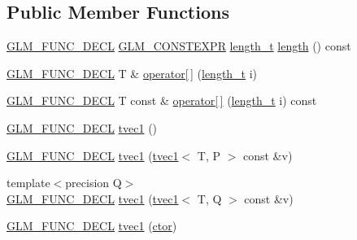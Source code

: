 \subsection*{Public Member Functions}
\begin{DoxyCompactItemize}
\item 
\hyperlink{setup_8hpp_ab2d052de21a70539923e9bcbf6e83a51}{G\+L\+M\+\_\+\+F\+U\+N\+C\+\_\+\+D\+E\+CL} \hyperlink{setup_8hpp_a08b807947b47031d3a511f03f89645ad}{G\+L\+M\+\_\+\+C\+O\+N\+S\+T\+E\+X\+PR} \hyperlink{namespaceglm_a090a0de2260835bee80e71a702492ed9}{length\+\_\+t} \hyperlink{structglm_1_1detail_1_1tvec1_a82fff0257ca2da5997924ce1146e34cb}{length} () const
\item 
\hyperlink{setup_8hpp_ab2d052de21a70539923e9bcbf6e83a51}{G\+L\+M\+\_\+\+F\+U\+N\+C\+\_\+\+D\+E\+CL} T \& \hyperlink{structglm_1_1detail_1_1tvec1_adb575b50f9ef01bf4a6a4ecdfb82ac59}{operator\mbox{[}$\,$\mbox{]}} (\hyperlink{namespaceglm_a090a0de2260835bee80e71a702492ed9}{length\+\_\+t} i)
\item 
\hyperlink{setup_8hpp_ab2d052de21a70539923e9bcbf6e83a51}{G\+L\+M\+\_\+\+F\+U\+N\+C\+\_\+\+D\+E\+CL} T const  \& \hyperlink{structglm_1_1detail_1_1tvec1_a219b839386858d9412d219bafc1b12ba}{operator\mbox{[}$\,$\mbox{]}} (\hyperlink{namespaceglm_a090a0de2260835bee80e71a702492ed9}{length\+\_\+t} i) const
\item 
\hyperlink{setup_8hpp_ab2d052de21a70539923e9bcbf6e83a51}{G\+L\+M\+\_\+\+F\+U\+N\+C\+\_\+\+D\+E\+CL} \hyperlink{structglm_1_1detail_1_1tvec1_aa5c5b819c38630370d7cadd0a578709e}{tvec1} ()
\item 
\hyperlink{setup_8hpp_ab2d052de21a70539923e9bcbf6e83a51}{G\+L\+M\+\_\+\+F\+U\+N\+C\+\_\+\+D\+E\+CL} \hyperlink{structglm_1_1detail_1_1tvec1_a5c5c89fea0163e5ad580d6b66347c726}{tvec1} (\hyperlink{structglm_1_1detail_1_1tvec1}{tvec1}$<$ T, P $>$ const \&v)
\item 
{\footnotesize template$<$precision Q$>$ }\\\hyperlink{setup_8hpp_ab2d052de21a70539923e9bcbf6e83a51}{G\+L\+M\+\_\+\+F\+U\+N\+C\+\_\+\+D\+E\+CL} \hyperlink{structglm_1_1detail_1_1tvec1_ae1002300caf6841b5a2effd442691db1}{tvec1} (\hyperlink{structglm_1_1detail_1_1tvec1}{tvec1}$<$ T, Q $>$ const \&v)
\item 
\hyperlink{setup_8hpp_ab2d052de21a70539923e9bcbf6e83a51}{G\+L\+M\+\_\+\+F\+U\+N\+C\+\_\+\+D\+E\+CL} \hyperlink{structglm_1_1detail_1_1tvec1_a52af6de6e305cdb9769a58fe40c9d0ae}{tvec1} (\hyperlink{structglm_1_1detail_1_1tvec1_a33f1783ca537d8dad5624e5adcf6bd5a}{ctor})
\item 

\end{DoxyCompactItemize}
